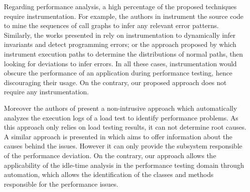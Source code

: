 \documentclass[runningheads,a4paper]{llncs}
\begin{document}
Regarding performance analysis, a high percentage of the proposed
techniques require instrumentation. For example, the authors in \cite{Yang1}
instrument the source code to mine the sequences of call graphs to infer any
relevant error patterns. Similarly, the works presented in
\cite{Hangal1,Csallner1} rely on instrumentation to dynamically infer
invariants and detect programming errors; or the approach proposed by
\cite{Chen2} which instrument execution paths to determine the distributions of
normal paths, then looking for deviations to infer errors. In
all these cases, instrumentation would obscure the performance of an application
during performance testing, hence discouraging their usage.
On the contrary, our proposed approach does not require any
instrumentation.

Moreover the authors of \cite{Jiang2009} present a non-intrusive approach which
automatically analyzes the execution logs of a load test to identify performance
problems. As this approach only relies on load testing results, it can not
determine root causes. A similar approach is presented in \cite{Malik1} which
aims to offer information about the causes behind the issues. However it can
only provide the subsystem responsible of the performance deviation. On the
contrary, our approach allows the applicability of the idle-time analysis in the
performance testing domain through automation, which allows the identification
of the classes and methods responsible for the performance issues. 


\vspace{-7pt}
\end{document}

